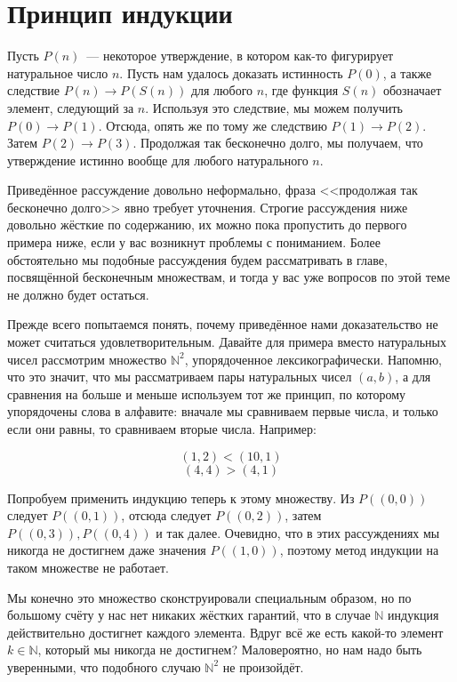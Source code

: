 \section{Принцип индукции}

Пусть $P(n)$~--- некоторое утверждение, в котором как-то фигурирует натуральное число $n$. Пусть нам удалось доказать истинность $P(0)$, а также следствие $P(n)\to P(S(n))$ для любого $n$, где функция $S(n)$ обозначает элемент, следующий за $n$. Используя это следствие, мы можем получить $P(0)\to P(1)$. Отсюда, опять же по тому же следствию $P(1)\to P(2)$. Затем $P(2)\to P(3)$. Продолжая так бесконечно долго, мы получаем, что утверждение истинно вообще для любого натурального $n$.

Приведённое рассуждение довольно неформально, фраза <<продолжая так бесконечно долго>> явно требует уточнения. Строгие рассуждения ниже довольно жёсткие по содержанию, их можно пока пропустить до первого примера ниже, если у вас возникнут проблемы с пониманием. Более обстоятельно мы подобные рассуждения будем рассматривать в главе, посвящённой бесконечным множествам, и тогда у вас уже вопросов по этой теме не должно будет остаться.

Прежде всего попытаемся понять, почему приведённое нами доказательство не может считаться удовлетворительным. Давайте для примера вместо натуральных чисел рассмотрим множество $\mathbb{N}^2$, упорядоченное лексикографически. Напомню, что это значит, что мы рассматриваем пары натуральных чисел $(a, b)$, а для сравнения на больше и меньше используем тот же принцип, по которому упорядочены слова в алфавите: вначале мы сравниваем первые числа, и только если они равны, то сравниваем вторые числа. Например:

$$(1, 2) < (10, 1)$$
$$(4, 4) > (4, 1)$$

Попробуем применить индукцию теперь к этому множеству. Из $P((0, 0))$ следует $P((0, 1))$, отсюда следует $P((0, 2))$, затем $P((0, 3)), P((0, 4))$ и так далее. Очевидно, что в этих рассуждениях мы никогда не достигнем даже значения $P((1, 0))$, поэтому метод индукции на таком множестве не работает.

Мы конечно это множество сконструировали специальным образом, но по большому счёту у нас нет никаких жёстких гарантий, что в случае $\mathbb{N}$ индукция действительно достигнет каждого элемента. Вдруг всё же есть какой-то элемент $k\in \mathbb{N}$, который мы никогда не достигнем? Маловероятно, но нам надо быть уверенными, что подобного случаю $\mathbb{N}^2$ не произойдёт.

